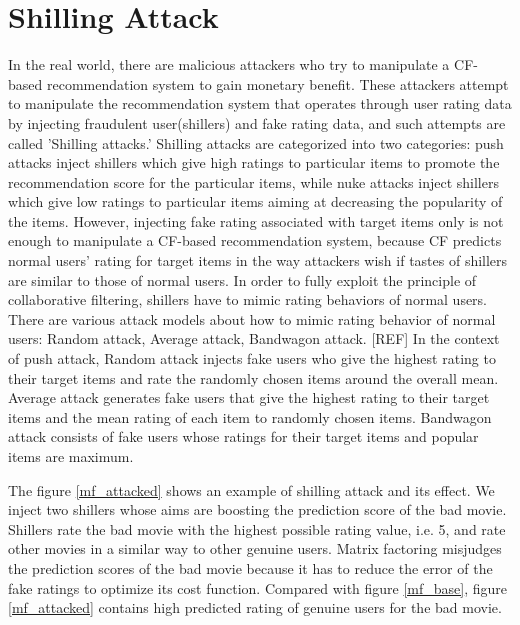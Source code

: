 \documentclass[master,english,final]{kaist-ucs}
\begin{document}
\section{Shilling Attack}
In the real world, there are malicious attackers who try to manipulate a CF-based recommendation system to gain monetary benefit.
These attackers attempt to manipulate the recommendation system that operates through user rating data by injecting fraudulent user(shillers) and fake rating data, and such attempts are called 'Shilling attacks.'
Shilling attacks are categorized into two categories: push attacks inject shillers which give high ratings to particular items to promote the recommendation score for the particular items, while nuke attacks inject shillers which give low ratings to particular items aiming at decreasing the popularity of the items.
However, injecting fake rating associated with target items only is not enough to manipulate a CF-based recommendation system, because CF predicts normal users' rating for target items in the way attackers wish if tastes of shillers are similar to those of normal users.
In order to fully exploit the principle of collaborative filtering, shillers have to mimic rating behaviors of normal users.
There are various attack models about how to mimic rating behavior of normal users: Random attack, Average attack, Bandwagon attack. [REF]
In the context of push attack, Random attack injects fake users who give the highest rating to their target items and rate the randomly chosen items around the overall mean.
Average attack generates fake users that give the highest rating to their target items and the mean rating of each item to randomly chosen items.
Bandwagon attack consists of fake users whose ratings for their target items and popular items are maximum.

The figure \ref{mf_attacked} shows an example of shilling attack and its effect. We inject two shillers whose aims are boosting the prediction score of the bad movie.
Shillers rate the bad movie with the highest possible rating value, i.e. 5, and rate other movies in a similar way to other genuine users.
Matrix factoring misjudges the prediction scores of the bad movie because it has to reduce the error of the fake ratings to optimize its cost function.
Compared with figure \ref{mf_base}, figure \ref{mf_attacked} contains high predicted rating of genuine users for the bad movie.
\end{document}
